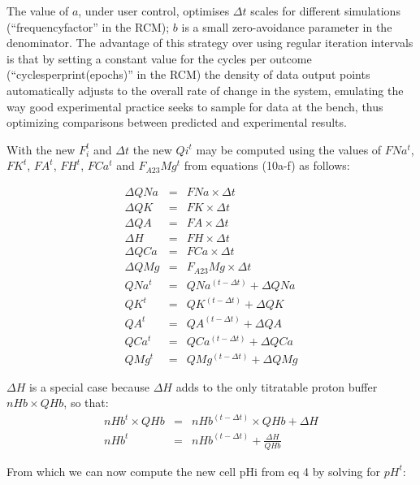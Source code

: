 \documentclass[a4paper]{article}
\newcommand{\F}[2]{F_{#1}#2}
\begin{document}
The value of $a$, under user control, optimises $\Delta t$ scales for different simulations (“frequencyfactor” in the RCM); $b$ is a small zero-avoidance parameter in the denominator. The advantage of this strategy over using regular iteration intervals is that by setting a constant value for the cycles per outcome (“cyclesperprint(epochs)” in the RCM) the density of data output points automatically adjusts to the overall rate of change in the system, emulating the way good experimental practice seeks to sample for data at the bench, thus optimizing comparisons between predicted and experimental results.    

With the new $F_i^t$ and $\Delta t$ the new $Qi^t$ may be computed using the values of $FNa^t$, $FK^t$, $FA^t$, $FH^t$, $FCa^t$ and $\F{A23}{Mg}^t$ from equations (10a-f) as follows:

\setcounter{equation}{0}
\renewcommand{\theequation}{20\alph{equation}}

\begin{eqnarray}
\Delta QNa &=& FNa\times\Delta t\\
\Delta QK &=& FK\times\Delta t \\
\Delta QA &=& FA\times\Delta t \\
\Delta H &=& FH\times\Delta t \\
\Delta QCa &=& FCa\times\Delta t \\
\Delta QMg &=& \F{A23}{Mg}\times\Delta t \\
QNa^t &=& QNa^{(t-\Delta t)} + \Delta QNa \\
QK^t &=& QK^{(t-\Delta t)} + \Delta QK  \\
QA^t &=& QA^{(t-\Delta t)} + \Delta QA  \\
QCa^t &=& QCa^{(t-\Delta t)} + \Delta QCa  \\
QMg^t &=& QMg^{(t-\Delta t)} + \Delta QMg
\end{eqnarray}

$\Delta H$ is a special case because $\Delta H$ adds to the only titratable proton buffer $nHb\times QHb$, so that:
\setcounter{equation}{0}
\renewcommand{\theequation}{21\alph{equation}}
\begin{eqnarray}
nHb^t\times QHb &=& nHb^{(t-\Delta t)}\times QHb + \Delta H \\
nHb^t &=& nHb^{(t-\Delta t)}  + \frac{\Delta H}{QHb}
\end{eqnarray}

From which we can now compute the new cell pHi from eq 4 by solving for $pH^t$:
\end{document}
